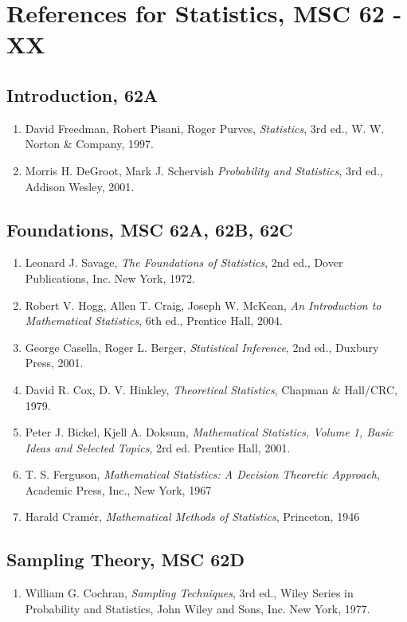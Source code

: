 \documentclass[12pt]{article}
\begin{document}
\section*{References for Statistics, MSC 62 - XX}

\subsection*{Introduction, 62A}
\begin{enumerate}
\item David Freedman, Robert Pisani, Roger Purves,
\emph{Statistics}, 3rd ed., W. W. Norton \& Company, 1997.
\item Morris H. DeGroot, Mark J. Schervish \emph{Probability and Statistics},
3rd ed., Addison Wesley, 2001.
\end{enumerate}

\subsection*{Foundations, MSC 62A, 62B, 62C}
\begin{enumerate}
\item Leonard J. Savage, \emph{The Foundations of Statistics},
2nd ed., Dover Publications, Inc. New York, 1972.
\item Robert V. Hogg, Allen T. Craig, Joseph W. McKean, \emph{An Introduction to
Mathematical Statistics}, 6th ed., Prentice Hall, 2004.
\item George Casella, Roger L. Berger, \emph{Statistical Inference}, 2nd ed.,
Duxbury Press, 2001.
\item David R. Cox, D. V. Hinkley, \emph{Theoretical Statistics}, Chapman \& Hall/CRC,
1979.
\item Peter J. Bickel, Kjell A. Doksum, \emph{Mathematical Statistics, Volume 1, Basic Ideas
and Selected Topics}, 2rd ed. Prentice Hall, 2001.
\item T. S. Ferguson, \emph{Mathematical Statistics: A Decision
Theoretic Approach}, Academic Press, Inc., New York, 1967
\item Harald Cram\'er, {\em Mathematical Methods of Statistics}, Princeton, 1946
\end{enumerate}

\subsection*{Sampling Theory, MSC 62D}
\begin{enumerate}
\item William G. Cochran, \emph{Sampling Techniques}, 3rd ed., Wiley
Series in Probability and Statistics, John Wiley and Sons, Inc. New
York, 1977.
\end{enumerate}
\end{document}
